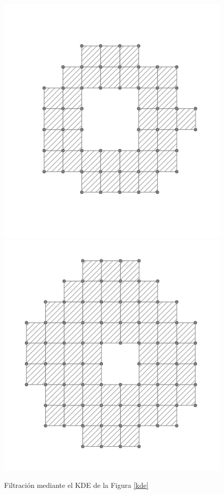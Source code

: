 \documentclass[12pt,a4paper,twoside]{article} %
\theoremstyle{plain}
\theoremstyle{definition}
\begin{document}
\begin{figure}[h!]
\includegraphics[scale=0.33]{img/f5.png}
\includegraphics[scale=0.33]{img/f6.png}
\caption{Filtración mediante el KDE de la Figura \ref{kde}}
\label{kde_filtration}
\end{figure}
\end{document}
